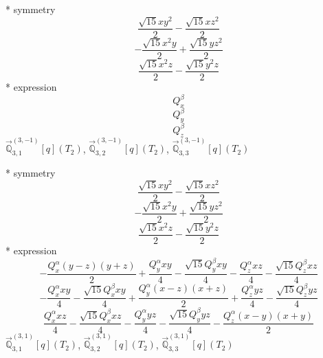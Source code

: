 \documentclass[fleqn,8pt]{jsarticle}
\begin{document}
\noindent\quad ** symmetry
\begin{dmath*}
\frac{\sqrt{15} x y^{2}}{2} - \frac{\sqrt{15} x z^{2}}{2}
\end{dmath*}
\begin{dmath*}
- \frac{\sqrt{15} x^{2} y}{2} + \frac{\sqrt{15} y z^{2}}{2}
\end{dmath*}
\begin{dmath*}
\frac{\sqrt{15} x^{2} z}{2} - \frac{\sqrt{15} y^{2} z}{2}
\end{dmath*}
\noindent\quad ** expression
\begin{dmath*}
Q_{x}^{\beta}
\end{dmath*}
\begin{dmath*}
Q_{y}^{\beta}
\end{dmath*}
\begin{dmath*}
Q_{z}^{\beta}
\end{dmath*}
\noindent\quad $\vec{\mathbb{Q}}_{3,1}^{(3,-1)}[q](T_{2})$, $\vec{\mathbb{Q}}_{3,2}^{(3,-1)}[q](T_{2})$, $\vec{\mathbb{Q}}_{3,3}^{(3,-1)}[q](T_{2})$

\noindent\quad ** symmetry
\begin{dmath*}
\frac{\sqrt{15} x y^{2}}{2} - \frac{\sqrt{15} x z^{2}}{2}
\end{dmath*}
\begin{dmath*}
- \frac{\sqrt{15} x^{2} y}{2} + \frac{\sqrt{15} y z^{2}}{2}
\end{dmath*}
\begin{dmath*}
\frac{\sqrt{15} x^{2} z}{2} - \frac{\sqrt{15} y^{2} z}{2}
\end{dmath*}
\noindent\quad ** expression
\begin{dmath*}
- \frac{Q_{x}^{\alpha} \left(y - z\right) \left(y + z\right)}{2} + \frac{Q_{y}^{\alpha} x y}{4} - \frac{\sqrt{15} Q_{y}^{\beta} x y}{4} - \frac{Q_{z}^{\alpha} x z}{4} - \frac{\sqrt{15} Q_{z}^{\beta} x z}{4}
\end{dmath*}
\begin{dmath*}
- \frac{Q_{x}^{\alpha} x y}{4} - \frac{\sqrt{15} Q_{x}^{\beta} x y}{4} + \frac{Q_{y}^{\alpha} \left(x - z\right) \left(x + z\right)}{2} + \frac{Q_{z}^{\alpha} y z}{4} - \frac{\sqrt{15} Q_{z}^{\beta} y z}{4}
\end{dmath*}
\begin{dmath*}
\frac{Q_{x}^{\alpha} x z}{4} - \frac{\sqrt{15} Q_{x}^{\beta} x z}{4} - \frac{Q_{y}^{\alpha} y z}{4} - \frac{\sqrt{15} Q_{y}^{\beta} y z}{4} - \frac{Q_{z}^{\alpha} \left(x - y\right) \left(x + y\right)}{2}
\end{dmath*}
\noindent\quad $\vec{\mathbb{Q}}_{3,1}^{(3,1)}[q](T_{2})$, $\vec{\mathbb{Q}}_{3,2}^{(3,1)}[q](T_{2})$, $\vec{\mathbb{Q}}_{3,3}^{(3,1)}[q](T_{2})$
\end{document}
